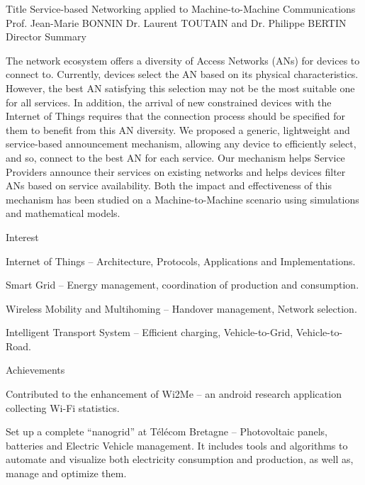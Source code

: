 \begin{cvhonors}
  \cvhonortwo
    {Title}
    {Service-based Networking applied to Machine-to-Machine Communications}
  \cvhonor
    {Prof. Jean-Marie BONNIN}
    {Dr. Laurent TOUTAIN and Dr. Philippe BERTIN}
    {}
    {Director}
  \cventryshort
    {Summary}
    {\begin{justify}
    \quad The network ecosystem offers a diversity of Access Networks (ANs) for devices to connect to. Currently, devices select the AN based on its physical characteristics. However, the best AN satisfying this selection may not be the most suitable one for all services. In addition, the arrival of new constrained devices with the Internet of Things requires that the connection process should be specified for them to benefit from this AN diversity. We proposed a generic, lightweight and service-based announcement mechanism, allowing any device to efficiently select, and so, connect to the best AN for each service. Our mechanism helps Service Providers announce their services on existing networks and helps devices filter ANs based on service availability. Both the impact and effectiveness of this mechanism has been studied on a Machine-to-Machine scenario using simulations and mathematical models.
    \end{justify}}


  \cventryshort   
    {Interest}
    {\begin{cvitems}
        \item {Internet of Things -- Architecture, Protocols, Applications and Implementations.}
        \item {Smart Grid -- Energy management, coordination of production and consumption.}
        \item {Wireless Mobility and Multihoming -- Handover management, Network selection.}
        \item {Intelligent Transport System -- Efficient charging, Vehicle-to-Grid, Vehicle-to-Road.}
      \end{cvitems}
      }
  \cventryshort
    {Achievements}
    {\begin{cvitems}
        \item {Contributed to the enhancement of Wi2Me – an android research application collecting Wi-Fi statistics.}
        \item {Set up a complete ``nanogrid'' at T\'{e}l\'{e}com Bretagne -- Photovoltaic panels, batteries and Electric Vehicle management. It includes tools and algorithms to automate and visualize both electricity consumption and production, as well as, manage and optimize them.}
      \end{cvitems}
      }


\end{cvhonors}
